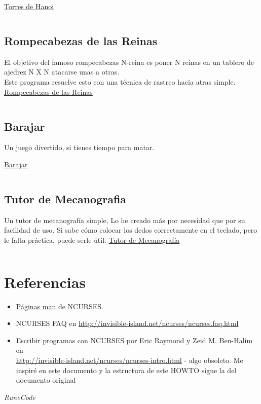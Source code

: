 \documentclass{article}
\begin{document}
\href{https://github.com/nasciiboy/NCURSES-Programming-HOWTO/blob/master/ncurses_programs/JustForFun/hanoi.c}{Torres de Hanoi}
\inputminted{cpp}{./cpp/hanoi.cpp}

\subsection{Rompecabezas de las Reinas}%
El objetivo del famoso rompecabezas N-reina es poner N reinas en un tablero de
ajedrez N X N atacarse unas a otras.\\

Este programa resuelve esto con una técnica de rastreo hacia atras simple.\\

\href{https://github.com/nasciiboy/NCURSES-Programming-HOWTO/blob/master/ncurses_programs/JustForFun/queens.c}{Rompecabezas de las Reinas}
\inputminted{cpp}{./cpp/queens.cpp}

\subsection{Barajar}%
Un juego divertido, si tienes tiempo para matar.

\href{https://github.com/nasciiboy/NCURSES-Programming-HOWTO/blob/master/ncurses_programs/JustForFun/shuffle.c}{Barajar}
\inputminted{cpp}{./cpp/shuffle.cpp}

\subsection{Tutor de Mecanografia}%
Un tutor de mecanografía simple, Lo he creado más por necesidad que por su
facilidad de uso. Si sabe cómo colocar los dedos correctamente en el teclado,
pero le falta práctica, puede serle útil.
\href{https://github.com/nasciiboy/NCURSES-Programming-HOWTO/blob/master/ncurses_programs/JustForFun/tt.c}{Tutor de Mecanografía}
\inputminted{cpp}{./cpp/tt.cpp}

\section{Referencias}%
\begin{itemize}
  \item \href{https://github.com/nasciiboy/NCURSES-Programming-HOWTO/blob/master/man/index.org}{Páginas man} de NCURSES.
  \item NCURSES FAQ en \href{http://invisible-island.net/ncurses/ncurses.faq.html}{http://invisible-island.net/ncurses/ncurses.faq.html}
  \item Escribir programas con NCURSES por Eric Raymond y Zeid M. Ben-Halim en\\
    \href{http://invisible-island.net/ncurses/ncurses-intro.html}{http://invisible-island.net/ncurses/ncurses-intro.html}
    - algo obsoleto. Me inspiré en este documento y la estructura de este HOWTO
    sigue la del documento original
\end{itemize}





\vspace{2cm}
\LARGE\textit{RuneCode}
\end{document}
